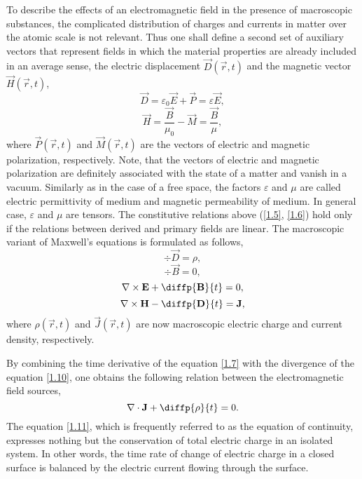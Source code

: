 To describe the effects of an electromagnetic field in the presence of macroscopic substances, the complicated distribution of charges and currents in matter over the atomic scale is not relevant. Thus one shall define a second set of auxiliary vectors that represent fields in which the material properties are already included in an average sense, the electric displacement $ \vec{D}\left( \vec{r}, t \right) $ and the magnetic vector $ \vec{H}\left( \vec{r}, t \right) $,
\begin{equation}
\label{1.5}
\vec{D} = \varepsilon_0 \vec{E} + \vec{P} = \varepsilon \vec{E},
\end{equation}
\begin{equation}
\label{1.6}
\vec{H} = \frac{\vec{B}}{\mu_0} - \vec{M} = \frac{\vec{B}}{\mu},
\end{equation}
where $ \vec{P}\left( \vec{r}, t \right) $ and $ \vec{M}\left( \vec{r}, t \right) $ are the vectors of electric and magnetic polarization, respectively. Note, that the vectors of electric and magnetic polarization are definitely associated with the state of a matter and vanish in a vacuum. Similarly as in the case of a free space, the factors $ \varepsilon $ and $ \mu $ are called electric permittivity of medium and magnetic permeability of medium. In general case, $ \varepsilon $ and $ \mu $ are tensors. The constitutive relations above (\ref{1.5}, \ref{1.6}) hold only if the relations between derived and primary fields are linear. The macroscopic variant of Maxwell's equations is formulated as follows,
\begin{equation}
\label{1.7}
\div{\vec{D}} = \rho,
\end{equation}
\begin{equation}
\label{1.8}
\div{\vec{B}} = 0,
\end{equation}
\begin{equation}
\label{1.9}
\rot{\vec{E}} + \diffp{\vec{B}}{t} = 0,
\end{equation}
\begin{equation}
\label{1.10}
\rot{\vec{H}} - \diffp{\vec{D}}{t} = \vec{J},
\end{equation}
where $ \rho\left(\vec{r}, t \right) $ and $ \vec{J}\left(\vec{r}, t \right) $ are now macroscopic electric charge and current density, respectively.

By combining the time derivative of the equation \ref{1.7} with the divergence of the equation \ref{1.10}, one obtains the following relation between the electromagnetic field sources,
\begin{equation}
\label{1.11}
\div{\vec{J}} + \diffp{\rho}{t} = 0.
\end{equation}
The equation \ref{1.11}, which is frequently referred to as the equation of continuity, expresses nothing but the conservation of total electric charge in an isolated system. In other words, the time rate of change of electric charge in a closed surface is balanced by the electric current flowing through the surface.

